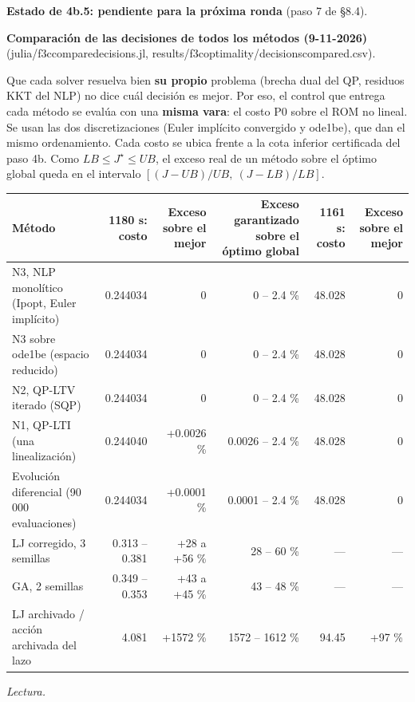 \documentclass[11pt,a4paper]{article}
\newcommand{\codeus}{\textunderscore\allowbreak}
\newcommand{\code}[1]{{\small\ttfamily\let\_\codeus #1}}
\begin{document}
\textbf{Estado de 4b.5: pendiente para la próxima ronda} (paso 7 de \S{}8.4).

\textbf{Comparación de las decisiones de todos los métodos (9-11-2026)} (\code{julia/f3c\_compare\_decisions.jl}, \code{results/f3c\_optimality/decisions\_compared.csv}).

Que cada solver resuelva bien \textbf{su propio} problema (brecha dual del QP, residuos KKT del NLP) no dice cuál decisión es mejor. Por eso, el control que entrega cada método se evalúa con una \textbf{misma vara}: el costo P0 sobre el ROM no lineal. Se usan las dos discretizaciones (Euler implícito convergido y \code{ode1be}), que dan el mismo ordenamiento. Cada costo se ubica frente a la cota inferior certificada del paso 4b. Como $LB\le J^\star\le UB$, el exceso real de un método sobre el óptimo global queda en el intervalo $[(J-UB)/UB,\ (J-LB)/LB]$.

{\footnotesize
\begin{xltabular}{\linewidth}{@{}YRRRRR@{}}
\toprule
\textbf{Método} & \textbf{1180 s: costo} & \textbf{Exceso sobre el mejor} & \textbf{Exceso garantizado sobre el óptimo global} & \textbf{1161 s: costo} & \textbf{Exceso sobre el mejor} \\
\midrule
\endhead
N3, NLP monolítico (Ipopt, Euler implícito) & 0.244034 & 0 & 0 – 2.4 \% & 48.028 & 0 \\
N3 sobre \code{ode1be} (espacio reducido) & 0.244034 & 0 & 0 – 2.4 \% & 48.028 & 0 \\
N2, QP-LTV iterado (SQP) & 0.244034 & 0 & 0 – 2.4 \% & 48.028 & 0 \\
N1, QP-LTI (una linealización) & 0.244040 & +0.0026 \% & 0.0026 – 2.4 \% & 48.028 & 0 \\
Evolución diferencial (90 000 evaluaciones) & 0.244034 & +0.0001 \% & 0.0001 – 2.4 \% & 48.028 & 0 \\
LJ corregido, 3 semillas & 0.313 – 0.381 & +28 a +56 \% & 28 – 60 \% & — & — \\
GA, 2 semillas & 0.349 – 0.353 & +43 a +45 \% & 43 – 48 \% & — & — \\
LJ archivado / acción archivada del lazo & 4.081 & +1572 \% & 1572 – 1612 \% & 94.45 & +97 \% \\
\bottomrule
\end{xltabular}}

\emph{Lectura.}
\end{document}
